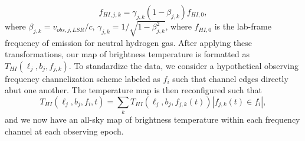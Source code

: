 \begin{equation*}
    f_{HI,j,k} = \gamma_{j,k}(1-\beta_{j,k})f_{HI,0},
\end{equation*}
where $\beta_{j,k}=v_{obs,j,LSR}/c$, $\gamma_{j,k}=1/\sqrt{1-\beta_{j,k}^2}$, where $f_{HI,0}$ is the lab-frame frequency of emission for neutral hydrogen gas. 
After applying these transformations, our map of brightness temperature is formatted as $T_{HI}(\ell_j,b_j,f_{j,k})$. 
To standardize the data, we consider a hypothetical observing frequency channelization scheme labeled as $f_i$ such that channel edges directly abut one another. 
The temperature map is then reconfigured such that
\begin{equation*}
    T_{HI}(\ell_j, b_j, f_i, t) = \sum_{k}T_{HI}(\ell_j,b_j,f_{j,k}(t))|f_{j,k}(t)\in f_i|,
\end{equation*}
and we now have an all-sky map of brightness temperature within each frequency channel at each observing epoch.

